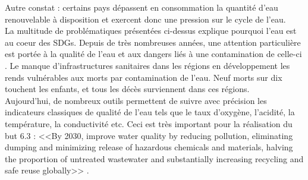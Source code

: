 \documentclass[10pt, article]{llncs}
\begin{document}
			Autre constat : certains pays dépassent en consommation la quantité d'eau renouvelable à disposition et exercent donc une pression sur le cycle de l'eau. \\
			La multitude de problématiques présentées ci-dessus explique pourquoi l'eau est au coeur des SDGs. Depuis de très nombreuses années, une attention particulière est portée à la qualité de l'eau et aux dangers liés à une contamination de celle-ci \cite{ashbolt_microbial_2004}. Le manque d'infrastructures sanitaires dans les régions en développement les rends vulnérables aux morts par contamination de l'eau. Neuf morts sur dix touchent les enfants, et tous les décès surviennent dans ces régions. \\
			Aujourd'hui, de nombreux outils permettent de suivre avec précision les indicateurs classiques de qualité de l'eau tels que le taux d'oxygène, l'acidité, la température, la conductivité etc. Ceci est très important pour la réalisation du but 6.3 : <<By 2030, improve water quality by reducing pollution, eliminating dumping and minimizing release of hazardous chemicals and materials, halving the proportion of untreated wastewater and substantially increasing recycling and safe reuse globally>> \cite{united_nations_goal_nodate-4}. \\
		
\end{document}
